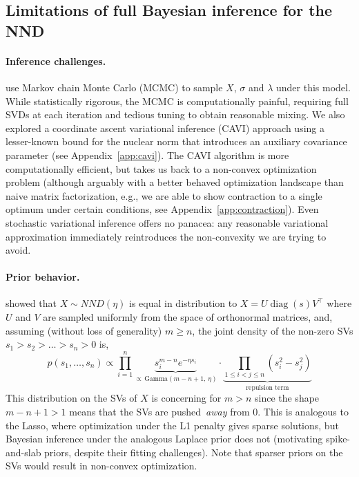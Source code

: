 \documentclass[11pt]{article}
\begin{document}
\subsection{Limitations of full Bayesian inference for the NND}

\paragraph{Inference challenges.} \citet{Segert2025-rk} use Markov chain Monte Carlo (MCMC) to sample $X$, $\sigma$ and $\lambda$ under this model. While statistically rigorous, the MCMC is computationally painful, requiring full SVDs at each iteration and tedious tuning to obtain reasonable mixing. We also explored a coordinate ascent variational inference (CAVI) approach using a lesser-known bound for the nuclear norm that introduces an auxiliary covariance parameter (see Appendix~\ref{app:cavi}). The CAVI algorithm is more computationally efficient, but takes us back to a non-convex optimization problem (although arguably with a better behaved optimization landscape than naive matrix factorization, e.g., we are able to show contraction to a single optimum under certain conditions, see Appendix~\ref{app:contraction}). Even stochastic variational inference offers no panacea: any reasonable variational approximation immediately reintroduces the non-convexity we are trying to avoid. 

\paragraph{Prior behavior.} \citet{Segert2025-rk} showed that $X \sim NND(\eta)$ is equal in distribution to $X = U \operatorname{diag}(s) V^\top$ where $U$ and $V$ are sampled uniformly from the space of orthonormal matrices, and, assuming (without loss of generality) $m \ge n$, the joint density of the non-zero SVs $s_1 > s_2 > \dots > s_n > 0$ is, 
\begin{equation} p(s_1, \dots, s_n) \propto \prod_{i=1}^n \underbrace{ s_i^{m-n} e^{-\eta s_i}}_{\propto \, \mathrm{Gamma}(m-n+1,\,\eta)} \cdot \underbrace{\prod_{1 \le i < j \le n} (s_i^2 - s_j^2)}_{\text{repulsion term}}
\label{eq:nnd-sv-distribution}
\end{equation}
This distribution on the SVs of $X$ is concerning for $m > n$ since the shape $m-n+1 > 1$ means that the SVs are pushed\ \emph{away} from $0$. This is analogous to the Lasso, where optimization under the L1 penalty gives sparse solutions, but Bayesian inference under the analogous Laplace prior does not (motivating spike-and-slab priors, despite their fitting challenges). Note that sparser priors on the SVs would result in non-convex optimization. 
\end{document}
